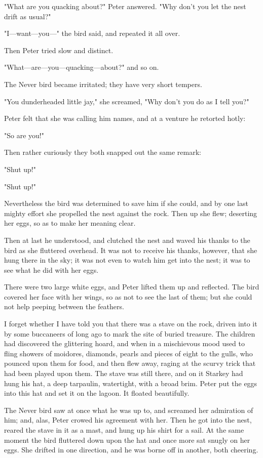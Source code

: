 "What are you quacking about?\@" Peter answered.
"Why don't you let the nest drift as usual?"

"I—want—you—" the bird said, and repeated it all over.

Then Peter tried slow and distinct.

"What—are—you—quacking—about?\@" and so on.

The Never bird became irritated;
they have very short tempers.

"You dunderheaded little jay," she screamed,
"Why don't you do as I tell you?"

Peter felt that she was calling him names, and at a venture he retorted hotly:

"So are you!"

Then rather curiously they both snapped out the same remark:

"Shut up!"

"Shut up!"

Nevertheless the bird was determined to save him if she could,
and by one last mighty effort she propelled the nest against the rock.
Then up she flew;
deserting her eggs, so as to make her meaning clear.

Then at last he understood, and clutched the nest and waved his thanks to the bird as she fluttered overhead.
It was not to receive his thanks, however, that she hung there in the sky;
it was not even to watch him get into the nest;
it was to see what he did with her eggs.

There were two large white eggs, and Peter lifted them up and reflected.
The bird covered her face with her wings, so as not to see the last of them;
but she could not help peeping between the feathers.

I forget whether I have told you that there was a stave on the rock,
driven into it by some buccaneers of long ago to mark the site of buried treasure.
The children had discovered the glittering hoard,
and when in a mischievous mood used to fling showers of moidores, diamonds, pearls and pieces of eight to the gulls,
who pounced upon them for food, and then flew away, raging at the scurvy trick that had been played upon them.
The stave was still there,
and on it Starkey had hung his hat, a deep tarpaulin, watertight, with a broad brim.
Peter put the eggs into this hat and set it on the lagoon.
It floated beautifully.

The Never bird saw at once what he was up to, and screamed her admiration of him;
and, alas, Peter crowed his agreement with her.
Then he got into the nest, reared the stave in it as a mast, and hung up his shirt for a sail.
At the same moment the bird fluttered down upon the hat and once more sat snugly on her eggs.
She drifted in one direction, and he was borne off in another, both cheering.

